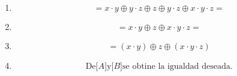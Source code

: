 \begin{enumerate}
\begin{enumerate}
\begin{enumerate}
\begin{enumerate}
\begin{enumerate}
        \item
          \[{= {x \cdot y}} \oplus {y \cdot z} \oplus z \oplus {y \cdot z} \oplus {{{x \cdot y} \cdot z} =}\]
        \item
          \[{= {x \cdot y}} \oplus z \oplus {{{x \cdot y} \cdot z} =}\]
        \item
          \[{= \left( {x \cdot y} \right)} \oplus z \oplus \left( {{x \cdot y} \cdot z} \right)\]
        \item
          \[\text{De}{\lbrack A\rbrack}\text{y}{\lbrack B\rbrack}\text{se obtine la igualdad deseada.}\]
        \end{enumerate}
      \end{enumerate}
    \end{enumerate}
  \end{enumerate}
\end{enumerate}

